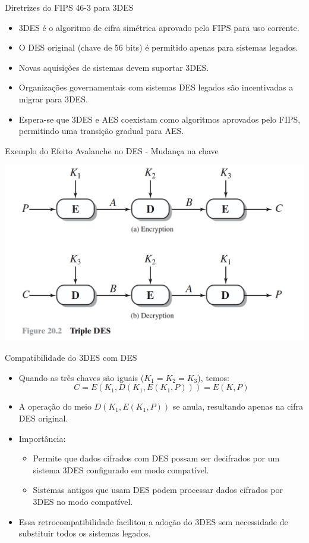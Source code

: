 \begin{frame}{Diretrizes do FIPS 46-3 para 3DES}
    \begin{itemize}
        \item 3DES é o algoritmo de cifra simétrica aprovado pelo FIPS para uso corrente.
        \item O DES original (chave de 56 bits) é permitido apenas para sistemas legados.
        \item Novas aquisições de sistemas devem suportar 3DES.
        \item Organizações governamentais com sistemas DES legados são incentivadas a migrar para 3DES.
        \item Espera-se que 3DES e AES coexistam como algoritmos aprovados pelo FIPS, permitindo uma transição gradual para AES.
    \end{itemize}
\end{frame}


\begin{frame}{Exemplo do Efeito Avalanche no DES - Mudança na chave}


\centering
    \includegraphics[width=0.9\linewidth]{Figuras/3des-ede.png}
    
\end{frame}

\begin{frame}{Compatibilidade do 3DES com DES}
    \begin{itemize}
        \item Quando as três chaves são iguais ($K_1 = K_2 = K_3$), temos:
        \[
            C = E(K_1, D(K_1, E(K_1, P))) = E(K, P)
        \]
        \item A operação do meio $D(K_1, E(K_1, P))$ se anula, resultando apenas na cifra DES original.
        \item Importância:
        \begin{itemize}
            \item Permite que dados cifrados com DES possam ser decifrados por um sistema 3DES configurado em modo compatível.
            \item Sistemas antigos que usam DES podem processar dados cifrados por 3DES no modo compatível.
        \end{itemize}
        \item Essa retrocompatibilidade facilitou a adoção do 3DES sem necessidade de substituir todos os sistemas legados.
    \end{itemize}
\end{frame}


